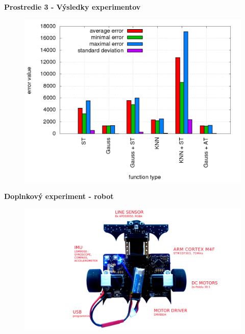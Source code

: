 \documentclass[xcolor=dvipsnames]{beamer}
\begin{document}
\begin{frame}{\bf Prostredie 3 - Výsledky experimentov}

\begin{figure}[!htb]
\centering
\includegraphics[scale=.36]{../../results_q_learning/map_3/trials_average_results.png}
\end{figure}

\end{frame}






\begin{frame}{\bf Doplnkový experiment - robot}

\begin{figure}[!htb]
\centering
\includegraphics[scale=.09]{../pictures/robot_hardware_white.jpg}
\end{figure}

\end{frame}
\end{document}
